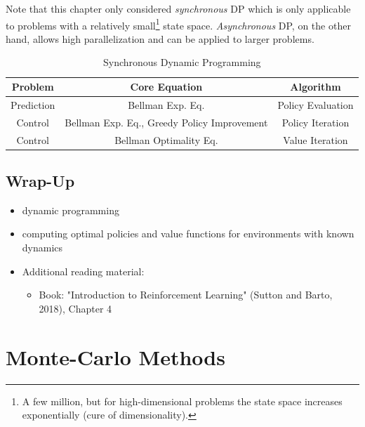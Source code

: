 		Note that this chapter only considered \emph{synchronous} \ac{DP} which is only applicable to problems with a relatively small\footnote{A few million, but for high-dimensional problems the state space increases exponentially (cure of dimensionality).} state space. \emph{Asynchronous} \ac{DP}, on the other hand, allows high parallelization and can be applied to larger problems.

		\begin{table}
			\centering
			\begin{tabular}{ccc}
				\toprule
				\textbf{Problem} &           \textbf{Core Equation}            & \textbf{Algorithm} \\ \midrule
				   Prediction    &              Bellman Exp. Eq.               & Policy Evaluation  \\
				    Control      & Bellman Exp. Eq., Greedy Policy Improvement &  Policy Iteration  \\
				    Control      &           Bellman Optimality Eq.            &  Value Iteration   \\ \bottomrule
			\end{tabular}
			\caption{Synchronous Dynamic Programming}
			\label{fig:syncDp}
		\end{table}

	\section{Wrap-Up}
		\begin{itemize}
			\item dynamic programming
			\item computing optimal policies and value functions for environments with known dynamics
			\item Additional reading material:
				\begin{itemize}
					\item Book: "Introduction to Reinforcement Learning" (Sutton and Barto, 2018), Chapter 4
				\end{itemize}
		\end{itemize}

\chapter{Monte-Carlo Methods}
	\label{c:mc}

